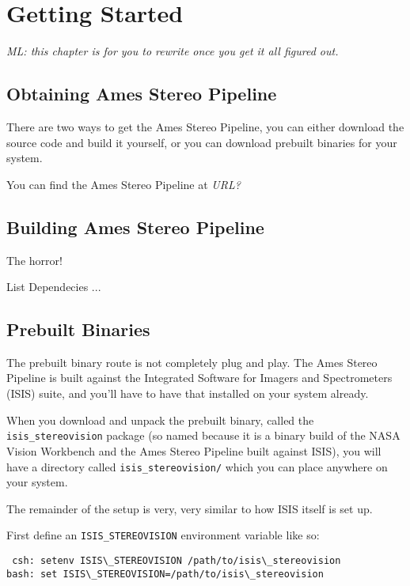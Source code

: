 \chapter{Getting Started}

\emph{ML: this chapter is for you to rewrite once you get it all figured out.}

\section{Obtaining Ames Stereo Pipeline}


There are two ways to get the Ames Stereo Pipeline, you can either
download the source code and build it yourself, or you can download
prebuilt binaries for your system.

You can find the Ames Stereo Pipeline at \emph{URL?}

\section{Building Ames Stereo Pipeline}

The horror!

List Dependecies ...


\section{Prebuilt Binaries}

The prebuilt binary route is not completely plug and play.  The
Ames Stereo Pipeline is built against the Integrated Software for
Imagers and Spectrometers (ISIS) suite, and you'll have to have
that installed on your system already.

When you download and unpack the prebuilt binary, called the
\texttt{isis\_stereovision} package (so named because it is a binary
build of the NASA Vision Workbench and the Ames Stereo Pipeline
built against ISIS), you will have a directory called
\texttt{isis\_stereovision/} which you can place anywhere on your
system.

The remainder of the setup is very, very similar to how ISIS itself
is set up.

First define an \texttt{ISIS\_STEREOVISION} environment variable like so:
\begin{verbatim}
 csh: setenv ISIS\_STEREOVISION /path/to/isis\_stereovision
bash: set ISIS\_STEREOVISION=/path/to/isis\_stereovision
\end{verbatim}

